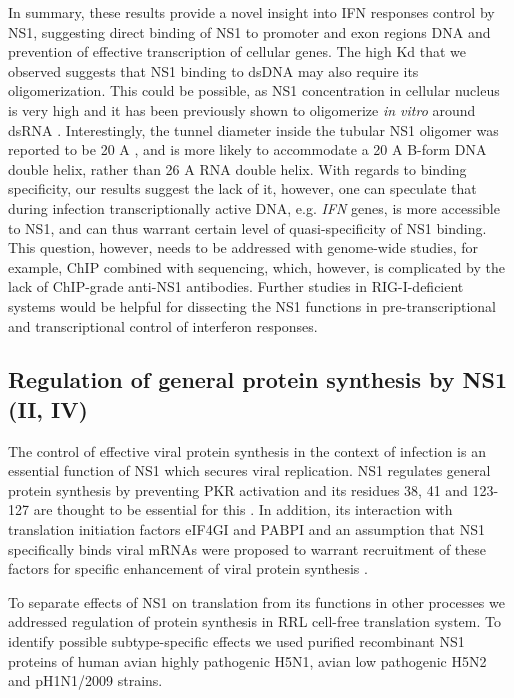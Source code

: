 		In summary, these results provide a novel insight into IFN responses control by NS1, suggesting direct binding of NS1 to promoter and exon regions DNA and prevention of effective transcription of cellular genes. The high \gls{Kd} that we observed suggests that NS1 binding to dsDNA may also require its oligomerization. This could be possible, as NS1 concentration in cellular nucleus is very high \parencite{Marazzi2012} and it has been previously shown to oligomerize \textit{in vitro} around dsRNA \parencite{Bornholdt2008}. Interestingly, the tunnel diameter inside the tubular NS1 oligomer was reported to be 20 \gls{A} \parencite{Bornholdt2008}, and is more likely to accommodate a 20 \gls{A} B-form DNA double helix, rather than 26 \gls{A} RNA double helix. With regards to binding specificity, our results suggest the lack of it, however, one can speculate that during infection transcriptionally active DNA, e.g. \textit{IFN} genes, is more accessible to NS1, and can thus warrant certain level of quasi-specificity of NS1 binding. This question, however, needs to be addressed with genome-wide studies, for example, \gls{ChIP} combined with sequencing, which, however, is complicated by the lack of \gls{ChIP}-grade anti-NS1 antibodies. Further studies in \gls{RIG-I}-deficient systems would be helpful for dissecting the NS1 functions in pre-transcriptional and transcriptional control of interferon responses. 								
						
	\subsection{Regulation of general protein synthesis by NS1 (II, IV)}
	
		The control of effective viral protein synthesis in the context of infection is an essential function of \gls{NS1} which secures viral replication. NS1 regulates general protein synthesis by preventing  \gls{PKR} activation and its residues 38, 41 and 123-127 are thought to be essential for this \parencite{Lu1995, Min2007}. In addition, its interaction with translation initiation factors \gls{eIF4GI} and \gls{PABP}I and an assumption that NS1 specifically binds viral mRNAs were proposed to warrant recruitment of these factors for specific enhancement of viral protein synthesis \parencite{DelaLuna1995, Aragon2000, Burgui2003}. 
		
		To separate effects of NS1 on translation from its functions in other processes we addressed regulation of protein synthesis in \gls{RRL} cell-free translation system. To identify possible subtype-specific effects we used purified recombinant NS1 proteins of human avian highly pathogenic H5N1, avian low pathogenic H5N2 and pH1N1/2009 strains. 
		
